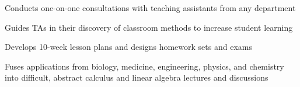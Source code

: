 \documentclass[letterpaper]{deedy-resume} %
\begin{document}
\begin{minipage}[t]{0.66\textwidth}
\vspace{5pt}
\begin{tightitemize}
    \item Conducts one-on-one consultations with teaching assistants from any department
    \item Guides TAs in their discovery of classroom methods to increase student learning
\end{tightitemize}

\vspace{5pt}


{\color{black}\begin{tightitemize}
    \item Develops 10-week lesson plans and designs homework sets and exams
    \item Fuses applications from biology, medicine, engineering, physics, and chemistry into difficult, abstract calculus and linear algebra lectures and discussions
\end{tightitemize}}


\vspace{5pt}


\end{minipage}
\end{document}
